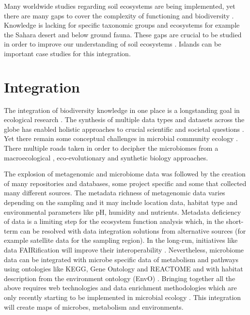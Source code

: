 Many worldwide studies regarding soil ecosystems are being implemented, yet
there are many gaps to cover the complexity of functioning and biodiversity
\parencite{guerra2020Blind}. Knowledge is lacking for specific taxonomic groups and
ecosystems for example the Sahara desert and below ground fauna.
These gaps are crucial to be studied in order to
improve our understanding of soil ecosystems \parencite{cameron2018Global}. 
Islands can be important case studies for this integration.

\section{Integration}
\label{sec:integration}

The integration of biodiversity knowledge in one place is a longstanding
goal in ecological research \parencite{Walter_2012}. The synthesis of multiple
data types and datasets across the globe has enabled 
holistic approaches to crucial scientific and societal questions \parencite{heberling_j_mason_data_2021}.
Yet there remain some conceptual challenges in microbial community ecology \parencite{prosser2020Conceptual}.
There multiple roads taken in order to decipher the microbiomes from a macroecological \parencite{Mascarenhas2020}, 
eco-evolutionary \parencite{martiny2023Investigating, loreau2023Opportunities} and synthetic biology \parencite{Leggieri2021} approaches.

The explosion of metagenomic and microbiome data was followed by the creation
of many repositories and databases, some project specific and some that
collected many different sources. The metadata richness of metagenomic data
varies depending on the sampling and it may include location data, habitat type
and environmental parameters like pH, humidity and nutrients. Metadata
deficiency of data is a limiting step for the ecosystem function analysis
which, in the short-term can be resolved with data integration solutions from
alternative sources (for example satellite data for the sampling region). In
the long-run, initiatives like data FAIRification will improve their
interoperability \parencite{wilkinson2016the-fair}. Nevertheless, microbiome data can be integrated with microbe
specific data of metabolism and pathways using ontologies like KEGG, Gene
Ontology and REACTOME and with habitat description from the environment
ontology (EnvO) \parencite{buttigieg2016environment}. Bringing together all the above requires web technologies and
data enrichment methodologies which are only recently starting to be
implemented in microbial ecology \parencite{jiang2016Microbiome}. This integration
will create maps of microbes, metabolism and environments. 

